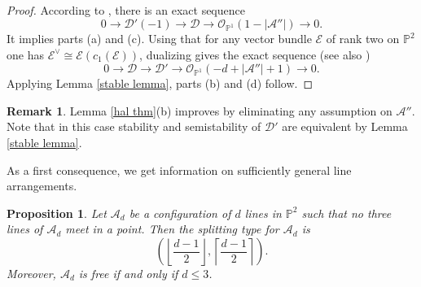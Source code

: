 \documentclass[12pt]{amsart}
\numberwithin{equation}{section}
\newtheorem{proposition}[theorem]{Proposition}
\theoremstyle{definition}
\newtheorem{remark}[theorem]{Remark}
\begin{document}
\begin{proof}
According to \cite[Theorem 3.2]{hal}, there is an exact sequence 
\[
0 \to {\mathcal{D}}' (-1) \to {\mathcal{D}} \to {\mathcal{O}}_{{ \ensuremath{\mathbb{P}}}^1} (1 - |{\mathcal{A}}''|) \to 0. 
\]
It implies parts (a) and (c). Using that for any vector bundle ${\mathcal{E}}$ of rank two on ${ \ensuremath{\mathbb{P}}}^2$ one has ${\mathcal{E}}^{\vee} \cong {\mathcal{E}} (c_1 ({\mathcal{E}}))$,  dualizing gives the exact sequence (see also \cite[Proposition 5.1]{FV2})
\begin{equation}
   \label{eq:dual hal}
0 \to  {\mathcal{D}} \to {\mathcal{D}}' \to {\mathcal{O}}_{{ \ensuremath{\mathbb{P}}}^1} (-d + |{\mathcal{A}}''| + 1) \to 0. 
\end{equation} 
Applying Lemma \ref{stable lemma}, parts (b) and (d) follow. 
\end{proof}

\begin{remark}
Lemma \ref{hal thm}(b) improves \cite[Theorem 4.5(b)] {hal} by eliminating any assumption on  ${\mathcal{A}}''$. Note that in this case stability and semistability of ${\mathcal{D}}'$ are equivalent by Lemma \ref{stable lemma}. 
\end{remark}

As a first consequence, we get information on sufficiently general line arrangements. 

\begin{proposition} 
        \label{star config type}
Let $\mathcal A_{d}$ be a configuration of  $d$ lines in $\mathbb P^2$ such that no three lines of $\mathcal A_{d}$ meet in a point.  Then the splitting type for $\mathcal A_{d}$ is
\[
\left ( \left \lfloor \frac{d-1}{2} \right \rfloor,  \left \lceil\frac{d-1}{2} \right \rceil \right ).
\]
Moreover, $\mathcal A_{d}$ is free if and only if $d \le 3$. 
\end{proposition}
\end{document}
